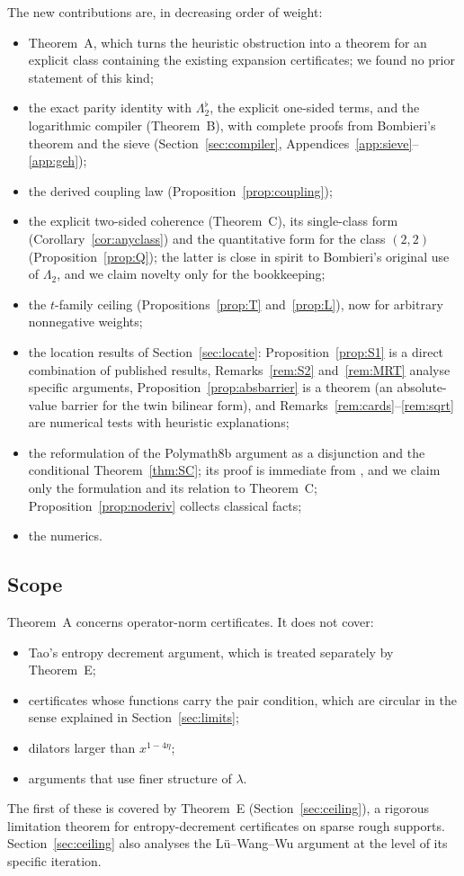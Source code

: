 \documentclass[11pt]{amsart}
\theoremstyle{definition}
\theoremstyle{remark}
\newcommand{\Lflat}{\Lambda_2^{\flat}}
\begin{document}
The new contributions are, in decreasing order of weight:
\begin{itemize}
\item Theorem~A, which turns the heuristic obstruction into a theorem for an explicit class containing the existing expansion certificates; we found no prior statement of this kind;
\item the exact parity identity with $\Lflat$, the explicit one-sided terms, and the logarithmic compiler (Theorem~B), with complete proofs from Bombieri's theorem and the sieve (Section~\ref{sec:compiler}, Appendices~\ref{app:sieve}--\ref{app:geh});
\item the derived coupling law (Proposition~\ref{prop:coupling});
\item the explicit two-sided coherence (Theorem~C), its single-class form (Corollary~\ref{cor:anyclass}) and the quantitative form for the class $(2,2)$ (Proposition~\ref{prop:Q}); the latter is close in spirit to Bombieri's original use of $\Lambda_2$, and we claim novelty only for the bookkeeping;
\item the $t$-family ceiling (Propositions~\ref{prop:T} and~\ref{prop:L}), now for arbitrary nonnegative weights;
\item the location results of Section~\ref{sec:locate}: Proposition~\ref{prop:S1} is a direct combination of published results, Remarks~\ref{rem:S2} and~\ref{rem:MRT} analyse specific arguments, Proposition~\ref{prop:absbarrier} is a theorem (an absolute-value barrier for the twin bilinear form), and Remarks~\ref{rem:cards}--\ref{rem:sqrt} are numerical tests with heuristic explanations;
\item the reformulation of the Polymath8b argument as a disjunction and the conditional Theorem~\ref{thm:SC}; its proof is immediate from \cite[Lemma~3.4]{Polymath8b}, and we claim only the formulation and its relation to Theorem~C; Proposition~\ref{prop:noderiv} collects classical facts;
\item the numerics.
\end{itemize}

\subsection{Scope}
Theorem~A concerns operator-norm certificates. It does not cover:
\begin{itemize}
\item Tao's entropy decrement argument, which is treated separately by Theorem~E;
\item certificates whose functions carry the pair condition, which are circular in the sense explained in Section~\ref{sec:limits};
\item dilators larger than $x^{1-4\eta}$;
\item arguments that use finer structure of $\lambda$.
\end{itemize}
The first of these is covered by Theorem~E (Section~\ref{sec:ceiling}), a rigorous limitation theorem for entropy-decrement certificates on sparse rough supports. Section~\ref{sec:ceiling} also analyses the Lü--Wang--Wu argument at the level of its specific iteration.
\end{document}
